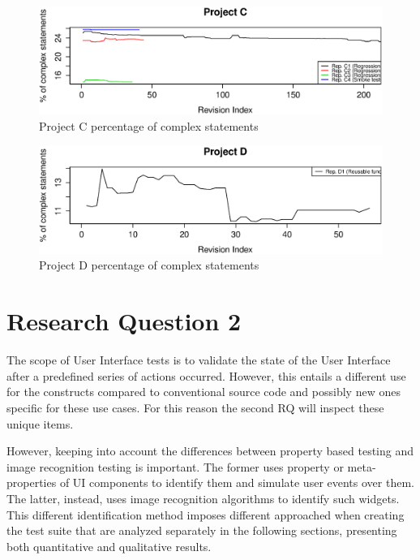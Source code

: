 \begin{figure}[!htbp]
    \centering
    \includegraphics[width=\textwidth]{figure/results/rq1/statement_complexity_project_c.eps}
    \caption{Project C percentage of complex statements}
    \label{fig:statement_complexity_project_c}
\end{figure}

\begin{figure}[!htbp]
    \centering
    \includegraphics[width=\textwidth]{figure/results/rq1/statement_complexity_project_d.eps}
    \caption{Project D percentage of complex statements}
    \label{fig:statement_complexity_project_d}
\end{figure}

\FloatBarrier

\section{Research Question 2}

The scope of User Interface tests is to validate the state of the User Interface after a predefined series of actions occurred. However, this entails a different use for the constructs compared to conventional source code and possibly new ones specific for these use cases. For this reason the second RQ will inspect these unique items.

However, keeping into account the differences between property based testing and image recognition testing is important. The former uses property or meta-properties of UI components to identify them and simulate user events over them. The latter, instead, uses image recognition algorithms to identify such widgets. This different identification method imposes different approached when creating the test suite that are analyzed separately in the following sections, presenting both quantitative and qualitative results.


